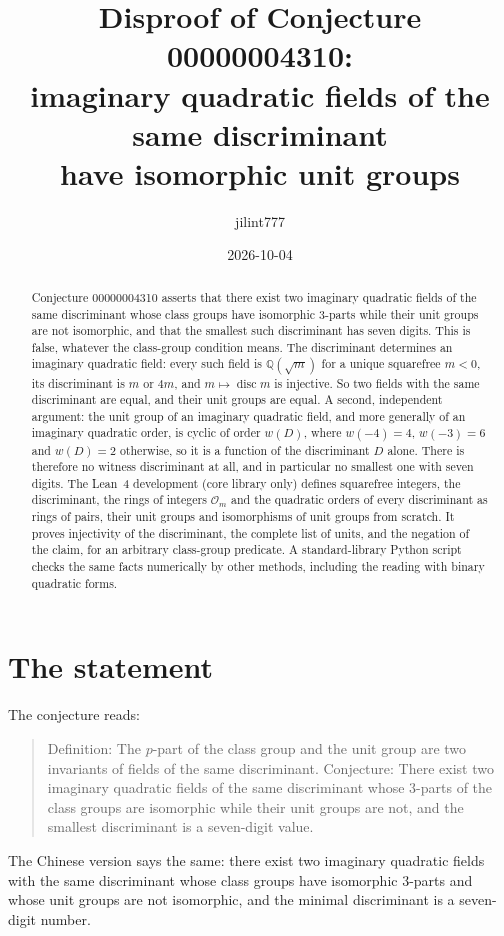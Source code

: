 \documentclass[11pt]{article}
\title{Disproof of Conjecture 00000004310:\\
imaginary quadratic fields of the same discriminant\\ have isomorphic unit groups}
\author{jilint777}
\date{2026-10-04}
\theoremstyle{definition}
\theoremstyle{remark}
\newcommand{\Q}{\mathbb{Q}}
\newcommand{\OO}{\mathcal{O}}
\newcommand{\disc}{\operatorname{disc}}
\begin{document}
\sloppy
\maketitle

\begin{abstract}
Conjecture 00000004310 asserts that there exist two imaginary quadratic fields of the same
discriminant whose class groups have isomorphic $3$-parts while their unit groups are not
isomorphic, and that the smallest such discriminant has seven digits. This is false, whatever
the class-group condition means. The discriminant determines an imaginary quadratic field: every
such field is $\Q(\sqrt m)$ for a unique squarefree $m<0$, its discriminant is $m$ or $4m$, and
$m\mapsto\disc m$ is injective. So two fields with the same discriminant are equal, and their
unit groups are equal. A second, independent argument: the unit group of an imaginary quadratic
field, and more generally of an imaginary quadratic order, is cyclic of order $w(D)$, where
$w(-4)=4$, $w(-3)=6$ and $w(D)=2$ otherwise, so it is a function of the discriminant $D$ alone.
There is therefore no witness discriminant at all, and in particular no smallest one with seven
digits. The Lean~4 development (core library only) defines squarefree integers, the
discriminant, the rings of integers $\OO_m$ and the quadratic orders of every discriminant as
rings of pairs, their unit groups and isomorphisms of unit groups from scratch. It proves
injectivity of the discriminant, the complete list of units, and the negation of the claim, for
an arbitrary class-group predicate. A standard-library Python script checks the same facts
numerically by other methods, including the reading with binary quadratic forms.
\end{abstract}

\section{The statement}
The conjecture reads:
\begin{quote}
Definition: The $p$-part of the class group and the unit group are two invariants of fields of
the same discriminant. Conjecture: There exist two imaginary quadratic fields of the same
discriminant whose $3$-parts of the class groups are isomorphic while their unit groups are not,
and the smallest discriminant is a seven-digit value.
\end{quote}
The Chinese version says the same: there exist two imaginary quadratic fields with the same
discriminant whose class groups have isomorphic $3$-parts and whose unit groups are not
isomorphic, and the minimal discriminant is a seven-digit number.
\end{document}
